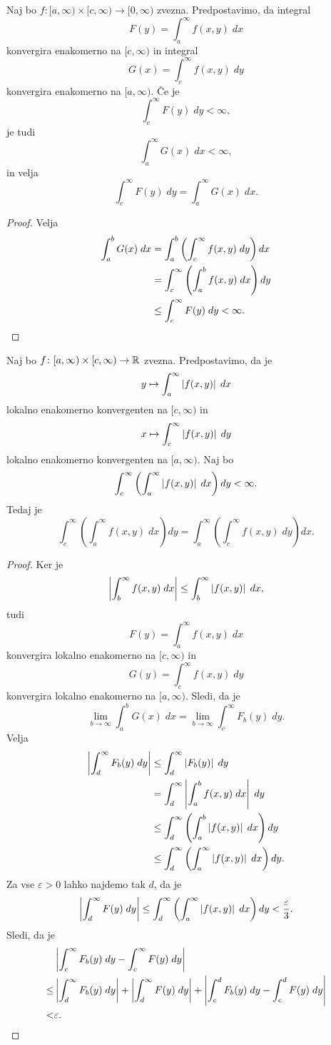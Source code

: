 \begin{izrek}[Fubini]
Naj bo $f \colon [a,\infty) \times [c,\infty) \to [0,\infty)$
zvezna. Predpostavimo, da integral
\[
F(y) = \int_a^\infty f(x,y)\;dx
\]
konvergira enakomerno na $[c,\infty)$ in integral
\[
G(x) = \int_c^\infty f(x,y)\;dy
\]
konvergira enakomerno na $[a,\infty)$. Če je
\[
\int_c^\infty F(y)\;dy < \infty,
\]
je tudi
\[
\int_a^\infty G(x)\;dx < \infty,
\]
in velja
\[
\int_c^\infty F(y)\;dy = \int_a^\infty G(x)\;dx.
\]
\end{izrek}

\begin{proof}
Velja
\begin{align*}
\int_a^b G(x)\;dx &=
\int_a^b \left(\int_c^\infty f(x,y)\;dy \right)dx
\\
&=
\int_c^\infty \left(\int_a^b f(x,y)\;dx\right)dy
\\
&\leq
\int_c^\infty F(y)\;dy < \infty. \qedhere
\end{align*}
\end{proof}

\begin{izrek}[Fubini]
Naj bo $f \colon [a,\infty) \times [c,\infty) \to \mathbb{R}$ zvezna.
Predpostavimo, da je
\[
y \mapsto \int_a^\infty \left\lvert f(x,y)\right\rvert\;dx
\]
lokalno enakomerno konvergenten na $[c,\infty)$ in
\[
x \mapsto \int_c^\infty \left\lvert f(x,y)\right\rvert\;dy
\]
lokalno enakomerno konvergenten na $[a,\infty)$. Naj bo
\[
\int_c^\infty \left(\int_a^\infty \left\lvert f(x,y)\right\rvert\;dx\right)dy < \infty.
\]
Tedaj je
\[
\int_c^\infty \left(\int_a^\infty f(x,y)\;dx\right)dy =
\int_a^\infty \left(\int_c^\infty f(x,y)\;dy\right)dx.
\]
\end{izrek}

\begin{proof}
Ker je
\[
\left\lvert \int_b^\infty f(x,y)\;dx\right\rvert \leq \int_b^\infty \left\lvert f(x,y)\right\rvert\;dx,
\]
tudi
\[
F(y) = \int_a^\infty f(x,y)\;dx
\]
konvergira lokalno enakomerno na $[c,\infty)$ in
\[
G(y) = \int_c^\infty f(x,y)\;dy
\]
konvergira lokalno enakomerno na $[a,\infty)$. Sledi, da je
\[
\lim_{b \to \infty}\int_a^b G(x)\;dx =
\lim_{b \to \infty}
\int_c^\infty F_b(y)\;dy.
\]
Velja
\begin{align*}
\left\lvert \int_d^\infty F_b(y)\;dy\right\rvert &\leq
\int_d^\infty \left\lvert F_b(y)\right\rvert\;dy
\\
&=
\int_d^\infty \left\lvert \int_a^b f(x,y)\;dx\right\rvert\;dy
\\
&\leq
\int_d^\infty \left(\int_a^b \left\lvert f(x,y)\right\rvert\;dx\right)dy
\\
&\leq
\int_d^\infty \left(\int_a^\infty \left\lvert f(x,y)\right\rvert\;dx\right)dy.
\end{align*}
Za vse $\varepsilon > 0$ lahko najdemo tak $d$, da je
\[
\left\lvert \int_d^\infty F(y)\;dy\right\rvert \leq
\int_d^\infty \left(\int_a^\infty \left\lvert f(x,y)\right\rvert\;dx\right)dy <
\frac{\varepsilon}{3}.
\]
Sledi, da je
\begin{align*}
&\left\lvert \int_c^\infty F_b(y)\;dy - \int_c^\infty F(y)\;dy\right\rvert
\\
\leq&
\left\lvert \int_d^\infty F_b(y)\;dy\right\rvert +
\left\lvert \int_d^\infty F(y)\;dy\right\rvert +
\left\lvert \int_c^d F_b(y)\;dy - \int_c^d F(y)\;dy\right\rvert
\\
<&
\varepsilon. \qedhere
\end{align*}
\end{proof}

